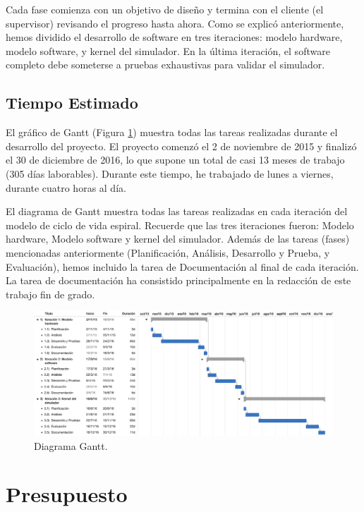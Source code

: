 Cada fase comienza con un objetivo de diseño y termina con el cliente (el supervisor) revisando el progreso hasta ahora. Como se explicó anteriormente, hemos dividido el desarrollo de software en tres iteraciones: modelo hardware, modelo software, y kernel del simulador. En la última iteración, el software completo debe someterse a pruebas exhaustivas para validar el simulador.

\subsection{Tiempo Estimado}

El gráfico de Gantt (Figura \ref{fig:gantt}) muestra todas las tareas realizadas durante el desarrollo del proyecto. El proyecto comenzó el 2 de noviembre de 2015 y finalizó el 30 de diciembre de 2016, lo que supone un total de casi 13 meses de trabajo (305 días laborables). Durante este tiempo, he trabajado de lunes a viernes, durante cuatro horas al día.

El diagrama de Gantt muestra todas las tareas realizadas en cada iteración del modelo de ciclo de vida espiral. Recuerde que las tres iteraciones fueron: Modelo hardware, Modelo software y kernel del simulador. Además de las tareas (fases) mencionadas anteriormente (Planificación, Análisis, Desarrollo y Prueba, y Evaluación), hemos incluido la tarea de Documentación al final de cada iteración. La tarea de documentación ha consistido principalmente en la redacción de este trabajo fin de grado.

\begin{figure}[htbp]
 	\centering
 	\includegraphics[width=16.5cm]{figures/ganttFuente}
 	\caption{Diagrama Gantt.}
	\label{fig:gantt}
\end{figure}

\section{Presupuesto}
\label{sec:budget}

